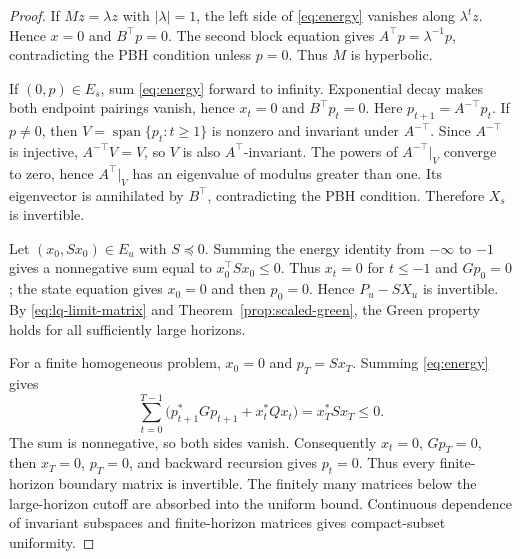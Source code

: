 \documentclass[twocolumn,nameyear,amsthm]{autart}
\numberwithin{equation}{section}
\begin{document}
\begin{proof}
If $Mz=\lambda z$ with $|\lambda|=1$, the left side of
\eqref{eq:energy} vanishes along $\lambda^tz$.  Hence $x=0$ and
$B^\top p=0$.  The second block equation gives
$A^\top p=\lambda^{-1}p$, contradicting the PBH condition unless $p=0$.
Thus $M$ is hyperbolic.

If $(0,p)\in E_s$, sum \eqref{eq:energy} forward to infinity.  Exponential
decay makes both endpoint pairings vanish, hence $x_t=0$ and
$B^\top p_t=0$.  Here $p_{t+1}=A^{-\top}p_t$.  If $p\ne0$, then
$V=\operatorname{span}\{p_t:t\ge1\}$ is nonzero and invariant under
$A^{-\top}$.  Since $A^{-\top}$ is injective, $A^{-\top}V=V$, so $V$ is also
$A^\top$-invariant.  The powers of $A^{-\top}|_V$ converge to zero, hence
$A^\top|_V$ has an eigenvalue of modulus greater than one.  Its eigenvector is
annihilated by $B^\top$, contradicting the PBH condition.  Therefore $X_s$
is invertible.

Let $(x_0,Sx_0)\in E_u$ with $S\preceq0$.  Summing the energy identity from
$-\infty$ to $-1$ gives a nonnegative sum equal to
$x_0^\top Sx_0\le0$.  Thus $x_t=0$ for $t\le-1$ and $Gp_0=0$; the state
equation gives $x_0=0$ and then $p_0=0$.  Hence
$P_u-SX_u$ is invertible.  By \eqref{eq:lq-limit-matrix} and
Theorem~\ref{prop:scaled-green}, the Green property holds for all sufficiently
large horizons.

For a finite homogeneous problem, $x_0=0$ and $p_T=Sx_T$.  Summing
\eqref{eq:energy} gives
\[
 \sum_{t=0}^{T-1}
 \bigl(p_{t+1}^*Gp_{t+1}+x_t^*Qx_t\bigr)
 =x_T^*Sx_T\le0.
\]
The sum is nonnegative, so both sides vanish.  Consequently $x_t=0$,
$Gp_T=0$, then $x_T=0$, $p_T=0$, and backward
recursion gives $p_t=0$.  Thus every finite-horizon boundary matrix is
invertible.  The finitely many matrices below the large-horizon cutoff are
absorbed into the uniform bound.  Continuous dependence of invariant
subspaces and finite-horizon matrices gives compact-subset uniformity.
\end{proof}
\end{document}
